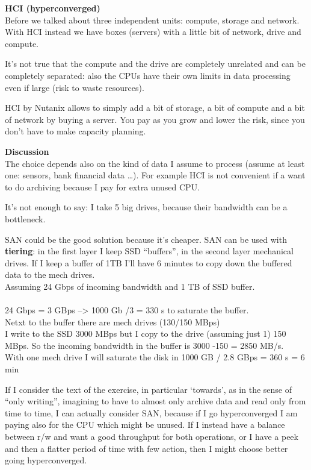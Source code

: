 \textbf{HCI (hyperconverged)}\\
Before we talked about three independent units: compute, storage and
network. With HCI instead we have boxes (servers) with a little bit of
network, drive and compute.

It's not true that the compute and the drive are completely unrelated
and can be completely separated: also the CPUs have their own limits in
data processing even if large (risk to waste resources).

HCI by Nutanix allows to simply add a bit of storage, a bit of compute
and a bit of network by buying a server. You pay as you grow and lower
the risk, since you don't have to make capacity planning.

\textbf{Discussion}\\
The choice depends also on the kind of data I assume to process (assume
at least one: sensors, bank financial data \ldots). For example HCI is
not convenient if a want to do archiving because I pay for extra unused
CPU.

It's not enough to say: I take 5 big drives, because their bandwidth can
be a bottleneck.

SAN could be the good solution because it's cheaper. SAN can be used
with \textbf{tiering}: in the first layer I keep SSD ``buffers'', in the
second layer mechanical drives. If I keep a buffer of 1TB I'll have 6
minutes to copy down the buffered data to the mech drives.\\
Assuming 24 Gbps of incoming bandwidth and 1 TB of SSD buffer.\\
\\
24 Gbps = 3 GBps --\textgreater{} 1000 Gb /3 = 330 s to saturate the
buffer.\\
Netxt to the buffer there are mech drives (130/150 MBps)\\
I write to the SSD 3000 MBps but I copy to the drive (assuming just 1)
150 MBps. So the incoming bandwidth in the buffer is 3000 -150 = 2850
MB/s.\\
With one mech drive I will saturate the disk in 1000 GB / 2.8 GBps = 360
s = 6 min

If I consider the text of the exercise, in particular `towards', as in
the sense of ``only writing'', imagining to have to almost only archive
data and read only from time to time, I can actually consider SAN,
because if I go hyperconverged I am paying also for the CPU which might
be unused. If I instead have a balance between r/w and want a good
throughput for both operations, or I have a peek and then a flatter
period of time with few action, then I might choose better going
hyperconverged.

